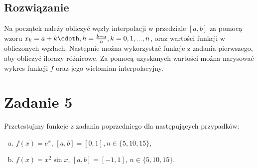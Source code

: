 \documentclass[12pt]{article}
\begin{document}
\subsection{Rozwiązanie}
Na początek należy obliczyć węzły interpolacji w przedziale $[a, b]$ za pomocą wzoru $x_k = a + k\cdoth, h = \frac{b - a}{n}, k=0, 1,..., n$, oraz wartości funkcji w obliczonych węzłach. Następnie można wykorzystać funkcje z zadania pierwszego, aby obliczyć ilorazy różnicowe. Za pomocą uzyskanych wartości można narysować wykres funkcji $f$ oraz jego wielomian interpolacyjny.


\section{Zadanie 5}
Przetestujmy funkcje z zadania poprzedniego dla następujących przypadków:
\begin{enumerate}[a)]
\item $f(x) = e^x$, $[a, b] = [0,1], n \in \{5,10,15\}$,
\item $f(x) = x^2\sin{x}$, $[a, b] = [-1,1]$, $n \in \{5,10,15\}$.
\end{enumerate}
\end{document}
